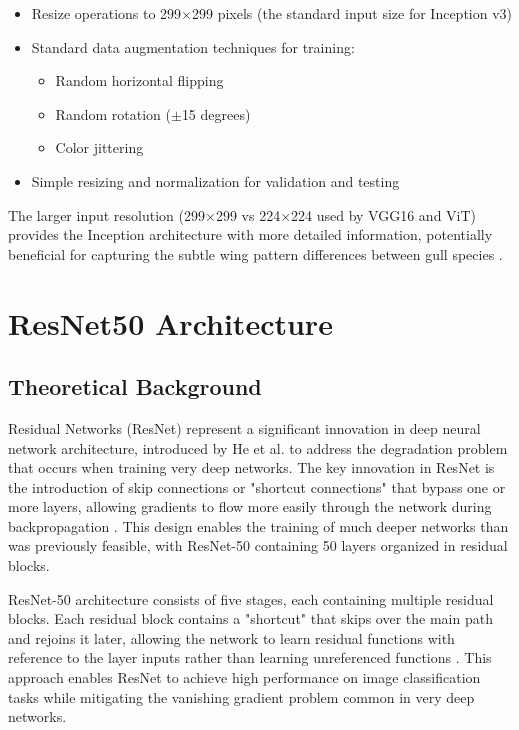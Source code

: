 \documentclass[a4paper,12pt]{article}
\begin{document}
\begin{itemize}
    \item Resize operations to 299$\times$299 pixels (the standard input size for Inception v3)
    \item Standard data augmentation techniques for training:
    \begin{itemize}
        \item Random horizontal flipping
        \item Random rotation ($\pm$15 degrees)
        \item Color jittering
    \end{itemize}
    \item Simple resizing and normalization for validation and testing
\end{itemize}

The larger input resolution (299$\times$299 vs 224$\times$224 used by VGG16 and ViT) provides the Inception architecture with more detailed information, potentially beneficial for capturing the subtle wing pattern differences between gull species \citep{dosovitskiy2020image}.


\section{ResNet50 Architecture}

\subsection{Theoretical Background}

Residual Networks (ResNet) represent a significant innovation in deep neural network architecture, introduced by He et al. to address the degradation problem that occurs when training very deep networks. The key innovation in ResNet is the introduction of skip connections or "shortcut connections" that bypass one or more layers, allowing gradients to flow more easily through the network during backpropagation \citep{he2016deep}. This design enables the training of much deeper networks than was previously feasible, with ResNet-50 containing 50 layers organized in residual blocks.

ResNet-50 architecture consists of five stages, each containing multiple residual blocks. Each residual block contains a "shortcut" that skips over the main path and rejoins it later, allowing the network to learn residual functions with reference to the layer inputs rather than learning unreferenced functions \citep{he2016deep, he2016identity}. This approach enables ResNet to achieve high performance on image classification tasks while mitigating the vanishing gradient problem common in very deep networks.
\end{document}
